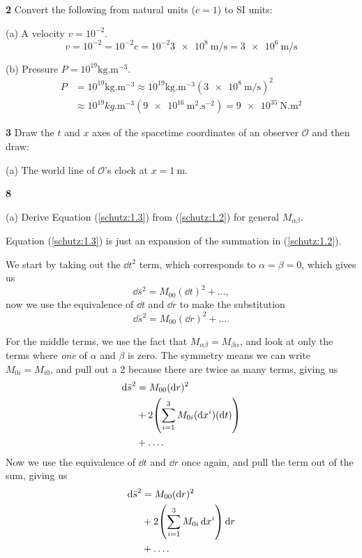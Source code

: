 \documentclass[gr-notes.tex]{subfiles}
\begin{document}
\textbf{2}
Convert the following from natural units ($c = 1$) to SI units:

(a) A velocity $v = 10^{-2}$.
\begin{displaymath}
  v = 10^{-2} =
  10^{-2} c =
  10^{-2} \SI{3e8}{\meter\per\second} =
  \SI{3e6}{\meter\per\second}
\end{displaymath}

(b) Pressure $P = 10^{19} \si{\kilogram.\meter^{-3}}$.
\begin{align*}
  P &=
  10^{19} \si{\kilogram.\meter^{-3}} \approx
  10^{19} \si{\kilogram.\meter^{-3}} (\SI{3e8}{\meter\per\second})^2
  \\ &\approx
  10^{19} \si{kg.\meter^{-3}} (\SI{9e16}{\meter^2.\second^{-2}}) =
  \SI{9e35}{\newton.\meter^2}
\end{align*}


\textbf{3}
Draw the $t$ and $x$ axes of the spacetime coordinates of an observer $\mathcal{O}$ and then draw:

(a) The world line of $\mathcal{O}$'s clock at $x = \SI{1}{\meter}$.



\textbf{8}

(a) Derive Equation (\ref{schutz:1.3}) from (\ref{schutz:1.2}) for general $M_{\alpha\beta}$.

Equation (\ref{schutz:1.3}) is just an expansion of the summation in (\ref{schutz:1.2}).

We start by taking out the $\dd{t}^2$ term, which corresponds to $\alpha = \beta = 0$, which gives us
%
\begin{displaymath}
  \dd{\bar{s}}^2 = M_{00} (\dd{t})^2 + \ldots,
\end{displaymath}
%
now we use the equivalence of $\dd{t}$ and $\dd{r}$ to make the substitution
%
\begin{displaymath}
  \dd{\bar{s}}^2 = M_{00} (\dd{r})^2 + \ldots.
\end{displaymath}

For the middle terms, we use the fact that $M_{\alpha\beta} = M_{\beta\alpha}$, and look at only the terms where \emph{one} of $\alpha$ and $\beta$ is zero. The symmetry means we can write $M_{0i} = M_{i0}$, and pull out a 2 because there are twice as many terms, giving us
%
\begin{align*}
  \dd{\bar{s}}^2 &=
  M_{00} (\dd{r})^2
  \\ &+
  2 \qty( \sum_{i=1}^3 M_{0i} (\dd{x^i}) (\dd{t}) )
  \\ &+
  \ldots.
\end{align*}
%
Now we use the equivalence of $\dd{t}$ and $\dd{r}$ once again, and pull the term out of the sum, giving us
%
\begin{align*}
  \dd{\bar{s}}^2 &=
  M_{00} (\dd{r})^2
  \\ &+
  2 \qty( \sum_{i=1}^3 M_{0i} \dd{x^i} ) \dd{r}
  \\ &+
  \ldots.
\end{align*}
\end{document}
